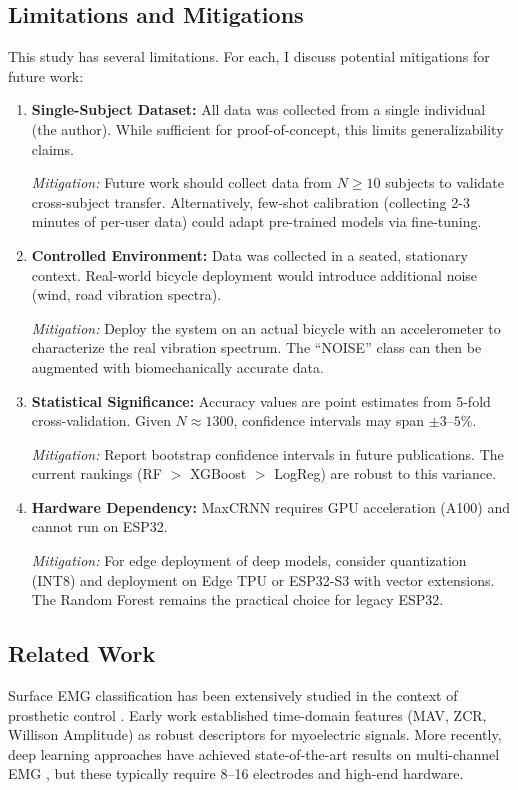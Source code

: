 \documentclass{article}
\begin{document}
\subsection{Limitations and Mitigations}
This study has several limitations. For each, I discuss potential mitigations for future work:

\begin{enumerate}
    \item \textbf{Single-Subject Dataset:} All data was collected from a single individual (the author). While sufficient for proof-of-concept, this limits generalizability claims.

    \textit{Mitigation:} Future work should collect data from $N \geq 10$ subjects to validate cross-subject transfer. Alternatively, few-shot calibration (collecting 2-3 minutes of per-user data) could adapt pre-trained models via fine-tuning.

    \item \textbf{Controlled Environment:} Data was collected in a seated, stationary context. Real-world bicycle deployment would introduce additional noise (wind, road vibration spectra).

    \textit{Mitigation:} Deploy the system on an actual bicycle with an accelerometer to characterize the real vibration spectrum. The ``NOISE'' class can then be augmented with biomechanically accurate data.

    \item \textbf{Statistical Significance:} Accuracy values are point estimates from 5-fold cross-validation. Given $N \approx 1300$, confidence intervals may span $\pm 3$--$5\%$.

    \textit{Mitigation:} Report bootstrap confidence intervals in future publications. The current rankings (RF $>$ XGBoost $>$ LogReg) are robust to this variance.

    \item \textbf{Hardware Dependency:} MaxCRNN requires GPU acceleration (A100) and cannot run on ESP32.

    \textit{Mitigation:} For edge deployment of deep models, consider quantization (INT8) and deployment on Edge TPU or ESP32-S3 with vector extensions. The Random Forest remains the practical choice for legacy ESP32.
\end{enumerate}

\subsection{Related Work}
Surface EMG classification has been extensively studied in the context of prosthetic control \cite{raez2006}. Early work established time-domain features (MAV, ZCR, Willison Amplitude) as robust descriptors for myoelectric signals. More recently, deep learning approaches have achieved state-of-the-art results on multi-channel EMG \cite{raez2006}, but these typically require 8--16 electrodes and high-end hardware.
\end{document}
